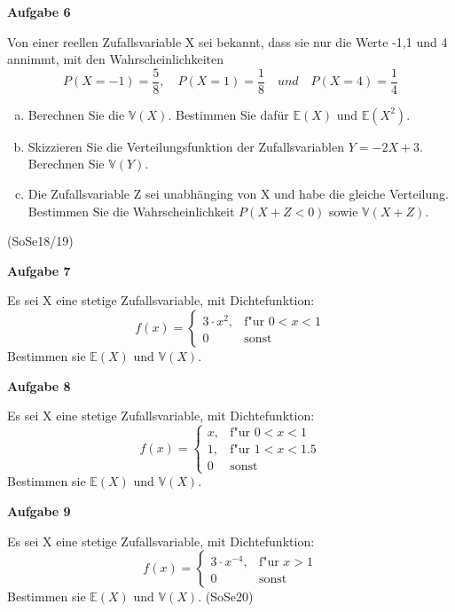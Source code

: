 \documentclass[a4paper,12pt]{article}
\newcommand{\Aufgabe}[1]{
  {
  \vspace*{0.5cm}
  \textsf{\textbf{Aufgabe #1}}
  \vspace*{0.2cm}
  
  }
}
\begin{document}
\Aufgabe{6}
Von einer reellen Zufallsvariable X sei bekannt, dass sie nur die Werte -1,1 und 4 annimmt, mit den Wahrscheinlichkeiten
$$ P(X=-1) = \frac{5}{8}, \quad P(X = 1) = \frac{1}{8}  \quad und  \quad P(X = 4) = \frac{1}{4} $$
\begin{enumerate}[a)]
\item Berechnen Sie die $\mathbb{V}(X)$. Bestimmen Sie dafür $\mathbb{E}(X)$ und $\mathbb{E}(X^2)$.
\item Skizzieren Sie die Verteilungsfunktion der Zufallsvariablen $ Y = -2X + 3 $. Berechnen Sie $\mathbb{V}(Y)$.
\item Die Zufallsvariable Z sei unabhänging von X und habe die gleiche Verteilung. Bestimmen Sie die Wahrscheinlichkeit $P(X + Z <  0)$ sowie $\mathbb{V}(X + Z  ) $.
\end{enumerate} 
(SoSe18/19)

\Aufgabe{7}
Es sei X eine stetige Zufallsvariable, mit Dichtefunktion:
\begin{equation}
   f(x) = \begin{cases}
     3\cdot x^2, & \text{f"ur }  0 < x < 1\\
    0 & \text{sonst }  
   \end{cases}
\end{equation}
Bestimmen sie $\mathbb{E}(X)$ und $\mathbb{V}(X)$.

\Aufgabe{8}
Es sei X eine stetige Zufallsvariable, mit Dichtefunktion:
\begin{equation}
   f(x) = \begin{cases}
     x , & \text{f"ur }  0 < x < 1\\
     1 , & \text{f"ur }  1 < x < 1.5\\
    0 & \text{sonst }  
   \end{cases}
\end{equation}
Bestimmen sie $\mathbb{E}(X)$ und $\mathbb{V}(X)$.



\Aufgabe{9}
Es sei X eine stetige Zufallsvariable, mit Dichtefunktion:
\begin{equation}
   f(x) = \begin{cases}
     3\cdot x^{-4}, & \text{f"ur }  x > 1\\
    0 & \text{sonst }  
   \end{cases}
\end{equation}
Bestimmen sie $\mathbb{E}(X)$ und $\mathbb{V}(X)$.
(SoSe20)
\end{document}
